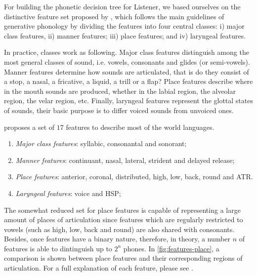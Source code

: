 For building the phonetic decision tree for Listener, we based ourselves on the distinctive feature set proposed by 
\citeauthor{Jensen2004} \citep{Jensen2004}, which follows the main guidelines of generative phonology by dividing
the features into four central classes: i) major class features, ii) manner features; iii) place features; and 
iv) laryngeal features.

In practice, classes work as following. Major class features distinguish among the most general classes of sound, 
i.e. vowels, consonants and glides (or semi-vowels). Manner features determine how sounds are articulated, 
that is do they consist of a stop, a nasal, a fricative, a liquid, a trill or a flap? Place features describe 
where in the mouth sounds are produced, whether in the labial region, the alveolar region, the velar region, etc.
Finally, laryngeal features represent the glottal states of sounds, their basic purpose is to differ voiced 
sounds from unvoiced ones.

\citeauthor{Jensen2004} \citep{Jensen2004} proposes a set of $17$ features to describe most of the world languages.

\begin{enumerate}
 \item \emph{Major class features}: syllabic, consonantal and sonorant;
 \item \emph{Manner features}: continuant, nasal, lateral, strident and delayed release;
 \item \emph{Place features}: anterior, coronal, distributed, high, low, back, round and \ac{ATR}.
 \item \emph{Laryngeal features}: voice and \ac{HSP};
\end{enumerate}

The somewhat reduced set for place features is capable of representing a large amount of places of articulation 
since features which are regularly restricted to vowels (such as high, low, back and round) are also shared 
with consonants. Besides, once features have a binary nature, therefore, in theory, a number $n$ of features is able
to dintinguish up to $2^n$ phones. In \autoref{fig:features-place}, a comparison is shown between place features and their corresponding
regions of articulation. For a full explanation of each feature, please see \citeauthor{Jensen2004} \citep{Jensen2004}.


